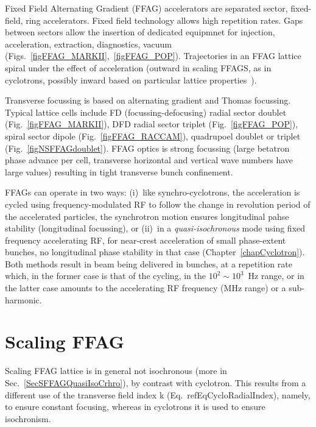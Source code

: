  Fixed Field Alternating Gradient (FFAG) accelerators are separated sector, fixed-field, ring accelerators. 
Fixed field technology allows high repetition rates. 
  Gaps between sectors allow the insertion of dedicated equipmnet for injection, acceleration, extraction, diagnostics, vacuum
(Figs.~\ref{figFFAG_MARKII},~\ref{figFFAG_POP}).
Trajectories in an FFAG lattice spiral under the effect of acceleration (outward in scaling FFAGS, as in cyclotrons, 
possibly inward based on particular lattice properties~\cite{FFAGInWardSpiral}). 

Transverse focussing is based on alternating gradient and Thomas focussing. 
Typical lattice cells include  FD (focussing-defocusing) radial sector doublet (Fig.~\ref{figFFAG_MARKII}), 
 DFD radial  sector triplet (Fig.~\ref{figFFAG_POP}), 
 spiral sector dipole  (Fig.~\ref{figFFAG_RACCAM}), quadrupoel doublet or triplet (Fig.~\ref{figNSFFAGdoublet}).
FFAG optics is strong focussing (large betatron phase advance per cell, 
transverse horizontal and vertical wave numbers have large values) 
 resulting in tight transverse bunch confinement.

FFAGs can operate in two ways: (i)~like synchro-cyclotrons, 
the acceleration is cycled using frequency-modulated 
RF to follow the change in revolution period of the accelerated particles, 
the synchrotron motion ensures longitudinal pahse stability (longitudinal focussing), 
 or (ii)~in a \textsl{quasi-isochronous} mode using fixed frequency accelerating RF, 
for  near-crest acceleration of small phase-extent bunches, no longitudinal phase stability in that case
(Chapter~\ref{chapCyclotron}). 
Both methods result in beam being delivered in bunches, at a repetition rate which, in the former case 
is that of the cycling, in the $10^2\sim 10^3$~Hz range, 
or in the latter case amounts to the accelerating RF frequency (MHz range) or a sub-harmonic. 


\section{Scaling FFAG \label{secSFFAG}}

Scaling FFAG lattice is in general not isochronous (more in Sec.~\ref{SecSFFAGQuasiIsoCrhro}), 
by contrast with cyclotron. This results from a different use of the transverse field index k (Eq.~ref{EqCycloRadialIndex}),
namely, to ensure constant focusing, whereas in cyclotrons it is used to ensure isochronism. 




